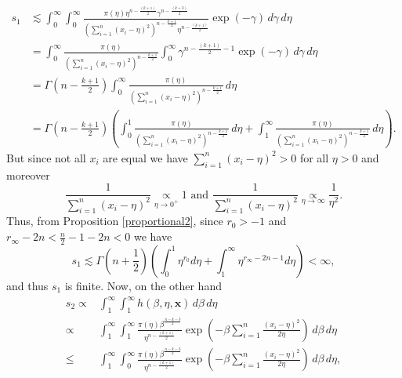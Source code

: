 \documentclass[12pt]{interact}
\theoremstyle{plain}%
\theoremstyle{definition}
\theoremstyle{remark}
\begin{document}
\begin{appendix}
\begin{equation*}
\begin{aligned}
s_1& \lesssim \int_0^\infty  
 \int_0^\infty \frac{\pi(\eta)\eta^{n-\frac{(k+1)}{2}}\gamma^{n-\frac{(k+3)}{2}}}{(\sum_{i=1}^{n}(x_i - \eta)^2)^{n-\frac{k+1}{2}}\eta^{n-\frac{(k+1)}{2}}} \exp\left( -\gamma\right) \, d\gamma\, d\eta
 \\ &
 = \int_0^\infty 
  \frac{\pi(\eta)}{(\sum_{i=1}^{n}(x_i - \eta)^2)^{n-\frac{k+1}{2}}} \int_0^\infty \gamma^{n-\frac{(k+1)}{2}-1}\exp\left( -\gamma\right) \, d\gamma\, d\eta
  \\ & = \Gamma\left(n-\frac{k+1}{2}\right)\int_0^\infty 
  \frac{\pi(\eta)}{(\sum_{i=1}^{n}(x_i - \eta)^2)^{n-\frac{k+1}{2}}}\, d\eta\\
 & = \Gamma\left(n-\frac{k+1}{2}\right)\left(\int_0^1 
  \frac{\pi(\eta)}{(\sum_{i=1}^{n}(x_i - \eta)^2)^{n-\frac{k+1}{2}}}\, d\eta + \int_1^\infty 
  \frac{\pi(\eta)}{(\sum_{i=1}^{n}(x_i - \eta)^2)^{n-\frac{k+1}{2}}}\, d\eta \right).
\end{aligned}
\end{equation*}
But since not all $x_i$ are equal we have $\sum_{i=1}^n (x_i-\eta)^2>0$ for all $\eta>0$ and moreover
\begin{equation*}\frac{1}{\sum_{i=1}^n (x_i-\eta)^2}\underset{\eta\to 0^+} {\propto }1\mbox{ and }
\frac{1}{\sum_{i=1}^n (x_i-\eta)^2}\underset{\eta\to \infty} {\propto }\frac{1}{\eta^2}.
\end{equation*}
Thus, from Proposition \ref{proportional2}, since $r_0>-1$ and $r_\infty - 2n < \frac{n}{2}-1 - 2n <0$ we have
\begin{equation*} s_1 \lesssim \Gamma\left(n+\frac{1}{2}\right)\left(\int_0^1 \eta^{r_0} d\eta + \int_1^\infty \eta^{r_\infty-2n-1} d\eta\right) <\infty,
\end{equation*}
and thus $s_1$ is finite.
Now, on the other hand
\begin{equation*}
\begin{aligned}
s_2 \propto& \int_1^\infty 
 \int_1^\infty h(\beta,\eta,\boldsymbol{x}) \, d\beta\, d\eta \\
  \propto& \int_1^\infty  
\int_1^\infty \frac{\pi(\eta)\beta^{\frac{n-k-3}{2}}}{\eta^{n-\frac{(k+1)}{2}}} \exp\left( -\beta\sum_{i=1}^{n}\frac{(x_i - \eta)^2}{2\eta} \right)\, d\beta\, d\eta\\
\leq& \int_1^\infty  
\int_0^\infty \frac{\pi(\eta)\beta^{\frac{n-k-3}{2}}}{\eta^{n-\frac{(k+1)}{2}}} \exp\left( -\beta\sum_{i=1}^{n}\frac{(x_i - \eta)^2}{2\eta} \right)\, d\beta\, d\eta,
 \end{aligned}

\end{equation*}
\end{appendix}
\end{document}
